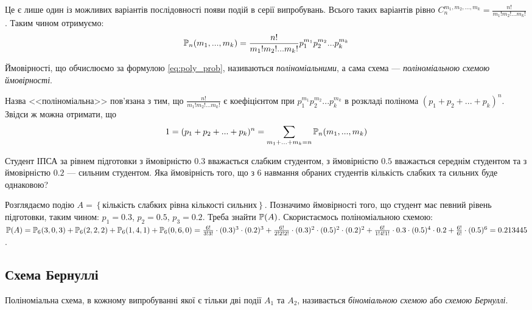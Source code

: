 Це є лише один із можливих варіантів послідовності появи подій в серії випробувань. Всього таких варіантів 
рівно $C_n^{m_1, m_2, ..., m_k} = \frac{n!}{m_1!m_2! ... m_k!}$. Таким чином отримуємо:
\begin{equation}\label{eq:poly_prob}
    \P_n(m_1, ..., m_k) = \frac{n!}{m_1!m_2! ... m_k!} p_1^{m_1} p_2^{m_2} ... p_k^{m_k}
\end{equation}
\begin{definition}
    Ймовірності, що обчислюємо за формулою \eqref{eq:poly_prob}, називаються \emph{поліноміальними}, а 
    сама схема --- \emph{поліноміальною схемою ймовірності}. 
\end{definition}
\begin{remark} Назва <<поліноміальна>> пов'язана з тим, що $\frac{n!}{m_1!m_2! ... m_k!}$
    є коефіцієнтом при $p_1^{m_1} p_2^{m_2} ... p_k^{m_k}$ в розкладі полінома $(p_1 + p_2 + ... + p_k)^n$.
    Звідси ж можна отримати, що
    $$1 = (p_1 + p_2 + ... + p_k)^n = \sum\limits_{m_1 + ... + m_k = n} \P_n(m_1, ..., m_k)$$
\end{remark}
\begin{example}
    Студент ІПСА за рівнем підготовки з ймовірністю $0.3$ вважається слабким студентом, 
    з ймовірністю $0.5$ вважається середнім студентом та 
    з ймовірністю $0.2$ --- сильним студентом. Яка ймовірність того, що з 6 навмання 
    обраних студентів кількість слабких та сильних буде однаковою?

    Розглядаємо подію $A = \left\{\text{кількість слабких рівна кількості сильних}\right\}$. 
    Позначимо ймовірності того, що студент має певний рівень підготовки, таким чином:
    $p_1 = 0.3$, $p_2 = 0.5$, $p_3 = 0.2$.
    Треба знайти $\P(A)$.
    Скористаємось поліноміальною схемою:
    $\P(A) = \P_6(3, 0, 3) + \P_6(2, 2, 2) + \P_6(1, 4, 1) + \P_6(0, 6, 0) = 
    \frac{6!}{3!3!}\cdot(0.3)^3 \cdot(0.2)^3 + \frac{6!}{2!2!2!}\cdot(0.3)^2 \cdot(0.5)^2 \cdot(0.2)^2 + 
    \frac{6!}{1!4!1!}\cdot0.3 \cdot(0.5)^4 \cdot 0.2 + \frac{6!}{6!} \cdot(0.5)^6 = 0.213445$.
\end{example}
\subsection{Схема Бернуллі}
\begin{definition}
    Поліноміальна схема, в кожному випробуванні якої є тільки дві події $A_1$ та $A_2$, 
    називається \emph{біноміальною схемою} або \emph{схемою Бернуллі}.
\end{definition}

